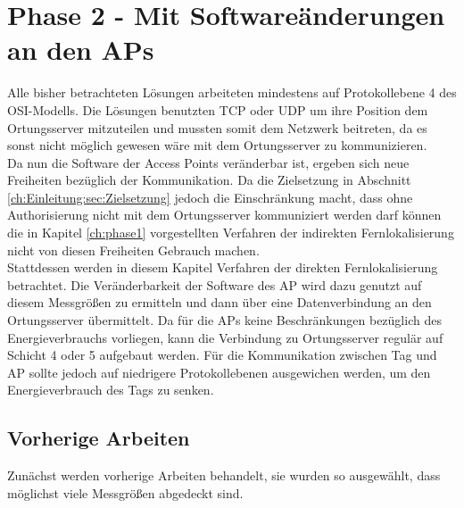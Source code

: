 \chapter{Phase 2 - Mit Softwareänderungen an den APs}
\label{ch:phase2}
Alle bisher betrachteten Lösungen arbeiteten mindestens auf Protokollebene 4 des OSI-Modells.
Die Lösungen benutzten TCP oder UDP um ihre Position dem Ortungsserver mitzuteilen und mussten somit dem Netzwerk beitreten, da es sonst nicht möglich gewesen wäre mit dem Ortungsserver zu kommunizieren.\\
Da nun die Software der Access Points veränderbar ist, ergeben sich neue Freiheiten bezüglich der Kommunikation.
Da die Zielsetzung in Abschnitt \ref{ch:Einleitung:sec:Zielsetzung} jedoch die Einschränkung macht, dass ohne Authorisierung nicht mit dem Ortungsserver kommuniziert werden darf können die in Kapitel \ref{ch:phase1} vorgestellten Verfahren der indirekten Fernlokalisierung nicht von diesen Freiheiten Gebrauch machen.\\
Stattdessen werden in diesem Kapitel Verfahren der direkten Fernlokalisierung betrachtet.
Die Veränderbarkeit der Software des AP wird dazu genutzt auf diesem Messgrößen zu ermitteln und dann über eine Datenverbindung an den Ortungsserver übermittelt.
Da für die APs keine Beschränkungen bezüglich des Energieverbrauchs vorliegen, kann die Verbindung zu Ortungsserver regulär auf Schicht 4 oder 5 aufgebaut werden.
Für die Kommunikation zwischen Tag und AP sollte jedoch auf niedrigere Protokollebenen ausgewichen werden, um den Energieverbrauch des Tags zu senken. \\

\section{Vorherige Arbeiten}
\label{ch:phase1:sec:vorherige}
Zunächst werden vorherige Arbeiten behandelt, sie wurden so ausgewählt, dass möglichst viele Messgrößen abgedeckt sind.


